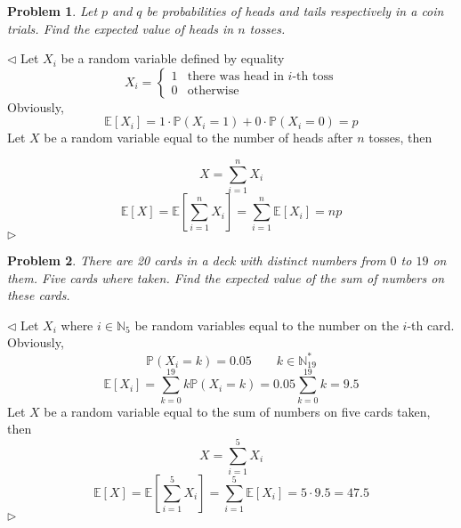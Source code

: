 \documentclass[12pt]{article}
\newtheorem{problem}{Problem}[subsection]
\newenvironment{solution}{\par $\triangleleft$}{$\triangleright$}
\begin{document}
\begin{problem} Let $p$ and $q$ be probabilities of heads and tails respectively
in  a coin trials. Find the expected value of heads in $n$ tosses.
\end{problem}
\begin{solution} Let $X_i$ be a random variable defined by equality
    $$
        X_i=\begin{cases}
            1 &
            \mbox{there was head in $i$-th toss} \\
            0 &
            \mbox{otherwise}
        \end{cases}
    $$
    Obviously,
    $$
        \mathbb{E}[X_i]=1\cdot\mathbb{P}({X_i=1})+0\cdot\mathbb{P}({X_i=0})=p
    $$
    Let $X$ be a random variable equal to the number of heads after $n$ tosses,
    then

    $$
        X=\sum_{i=1}^n X_i
    $$
    $$
        \mathbb{E}[X]=\mathbb{E}\left[\sum_{i=1}^n X_i\right]
        =\sum_{i=1}^n\mathbb{E}[X_i]=np
    $$
\end{solution}


\begin{problem} There are 20 cards in a deck with distinct numbers from $0$ to
$19$ on them. Five cards where taken. Find the expected value of the sum of
numbers on these cards.
\end{problem}
\begin{solution} Let $X_i$ where $i\in \mathbb{N}_5$ be random variables equal
    to the number on the $i$-th card. Obviously,
    $$
        \mathbb{P}({X_i=k})=0.05\qquad k\in\mathbb{N}_{19}^*
    $$
    $$
        \mathbb{E}[X_i]=\sum_{k=0}^{19}k\mathbb{P}({X_i=k})
        =0.05\sum_{k=0}^{19} k=9.5
    $$
    Let $X$ be a random variable equal to the sum of numbers on five cards
    taken, then
    $$
        X=\sum_{i=1}^5 X_i
    $$
    $$
        \mathbb{E}[X]=\mathbb{E}\left[\sum_{i=1}^5 X_i\right]
        =\sum_{i=1}^5\mathbb{E}[X_i]=5\cdot 9.5=47.5
    $$
\end{solution}
\end{document}
